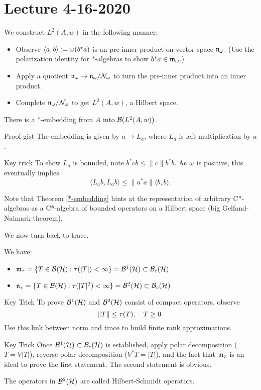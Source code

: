 \section{Lecture 4-16-2020}
We construct $L^2(A,w)$ in the following manner:
\begin{itemize}
    \item Observe $ \langle a, b \rangle := \omega(b^*a) $ is an pre-inner product on vector space $\mathfrak n_\omega$. (Use the polarization identity for *-algebras to show $b^*a \in \mathfrak m_\omega$.)
    \item Apply a quotient $\mathfrak n_\omega \rightarrow \mathfrak n_\omega/{\mathcal N}_\omega$ to turn the pre-inner product into an inner product.
    \item Complete $\mathfrak n_\omega/{\mathcal N}_\omega$ to get $L^2(A,w)$, a Hilbert space.
\end{itemize}
\begin{thm}[C* Representation]
    \label{*-embedding}
    There is a *-embedding from $A$ into ${\mathcal B}(L^2(A,w))$.
\end{thm}
\begin{details}{Proof gist}
    The embedding is given by $a \rightarrow L_a$, where $L_a$ is left multiplication by $a$.
\end{details}
\begin{details}{Key trick}
    To show $L_a$ is bounded, note $b^*cb \leq \|c\|b^*b$. As $\omega$ is positive, this eventually implies
    \[
        \langle L_ab, L_ab \rangle \leq \|a^*a\| \langle b,b \rangle.
    \]
\end{details}
Note that Theorem \ref{*-embedding} hints at the representation of arbitrary C*-algebras as a C*-algebra of bounded operators on a Hilbert space (big Gelfand-Naimark theorem).

We now turn back to trace.
\begin{thm}
    We have:
    \begin{itemize}
        \item $\mathfrak m_\tau = \{T \in {\mathcal B}({\mathcal H}): \tau(|T|) < \infty \} = {\mathcal B}^1({\mathcal H}) \subset {\mathcal B}_c({\mathcal H})$
        \item $\mathfrak n_\tau = \{T \in {\mathcal B}({\mathcal H}): \tau(|T|^2) < \infty \} = {\mathcal B}^2({\mathcal H}) \subset {\mathcal B}_c({\mathcal H})$
    \end{itemize}
\end{thm}
\begin{details}{Key Trick}
    To prove ${\mathcal B}^1({\mathcal H})$ and ${\mathcal B}^2({\mathcal H})$ consist of compact operators, observe
    \[
        \|T\| \leq \tau(T), \quad T \geq 0.
    \]
    Use this link between norm and trace to build finite rank approximations.
\end{details}
\begin{details}{Key Trick}
    Once ${\mathcal B}^1({\mathcal H}) \subset {\mathcal B}_c({\mathcal H})$ is established, apply polar decomposition ($T = V|T|$), reverse polar decomposition ($V^*T = |T|$), and the fact that $\mathfrak m_\tau$ is an ideal to prove the first statement. The second statement is obvious.
\end{details}
\begin{dfn}
    The operators in ${\mathcal B}^2({\mathcal H})$ are called Hilbert-Schmidt operators.
\end{dfn}
